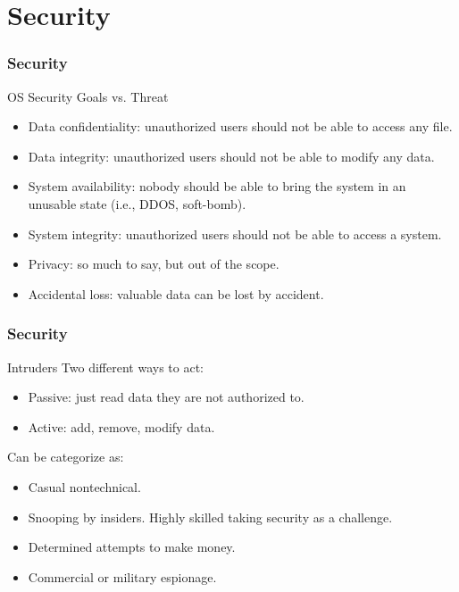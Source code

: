 \section{Security}

  \begin{frame}
      \frametitle{Security}
      \begin{block}{OS Security Goals vs. Threat}
        \begin{itemize}
          \item Data confidentiality: unauthorized users should not be able to access any file.
          \item Data integrity: unauthorized users should not be able to modify any data.
          \item System availability: nobody should be able to bring the system in an unusable state (i.e., DDOS, soft-bomb).
          \item System integrity: unauthorized users should not be able to access a system.
          \item Privacy: so much to say, but out of the scope.
          \item Accidental loss: valuable data can be lost by accident.
        \end{itemize}
      \end{block}
  \end{frame}

    \begin{frame}
        \frametitle{Security}
        \begin{block}{Intruders}
          Two different ways to act:
          \begin{itemize}
            \item Passive: just read data they are not authorized to.
            \item Active: add, remove, modify data.
          \end{itemize}
          Can be categorize as:
          \begin{itemize}
            \item Casual nontechnical.
            \item Snooping by insiders. Highly skilled taking security as a challenge.
            \item Determined attempts to make money.
            \item Commercial or military espionage.
          \end{itemize}
        \end{block}
    \end{frame}

